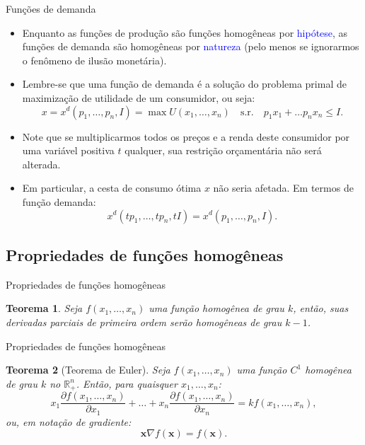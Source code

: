 \documentclass[10pt]{beamer}
\newtheorem{teo}{Teorema}
\begin{document}
\begin{frame}{Funções de demanda}
    \begin{itemize}
        \item Enquanto as funções de produção são funções homogêneas por \textcolor{blue}{hipótese}, as funções de demanda são homogêneas por \textcolor{blue}{natureza} (pelo menos se ignorarmos o fenômeno de ilusão monetária).
        \bigskip
        \item Lembre-se que uma função de demanda é a solução do problema primal de maximização de utilidade de um consumidor, ou seja:
        \[
        x = x^d(p_1, \dots, p_n, I) = \max U(x_1, \dots, x_n) \quad \text{s.r.} \quad p_1 x_1 + \dots p_n x_n \leq I.
        \]
         
        \item Note que se multiplicarmos todos os preços e a renda deste consumidor por uma variável positiva $t$ qualquer, sua restrição orçamentária não será alterada.
        \bigskip
        \item Em particular, a cesta de consumo ótima $x$ não seria afetada. Em termos de função demanda:
        \[
        x^d(tp_1, \dots, tp_n, tI) = x^d(p_1, \dots, p_n, I).
        \]
    \end{itemize}
\end{frame}

\subsection{Propriedades de funções homogêneas}
\begin{frame}{Propriedades de funções homogêneas}
    \begin{teo}
        Seja $f(x_1, \dots, x_n)$ uma função homogênea de grau $k$, então, suas derivadas parciais de primeira ordem serão homogêneas de grau $k - 1$.
    \end{teo}
\end{frame}

\begin{frame}{Propriedades de funções homogêneas}
    \begin{teo}[Teorema de Euler]
    Seja $f(x_1, \dots, x_n)$ uma função $C^1$ homogênea de grau $k$ no $\mathbb{R}_+^n$. Então, para quaisquer $x_1, \dots, x_n$:
    \begin{equation}
        x_1 \frac{\partial f(x_1, \dots, x_n)}{\partial x_1} + \dots + x_n \frac{\partial f(x_1, \dots, x_n)}{\partial x_n} = kf(x_1, \dots, x_n),
        \label{eq2}
    \end{equation}
    ou, em notação de gradiente:
    \begin{equation*}
        \mathbf{x} \nabla f(\mathbf{x}) = f(\mathbf{x}).
    \end{equation*}
    \end{teo}
\end{frame}
\end{document}
